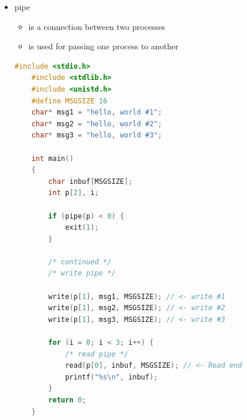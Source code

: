 \documentclass[12pt]{article}
\begin{document}
\bigskip

\begin{itemize}
    \item pipe
    \begin{itemize}
        \item is a connection between two processes
        \item is used for passing one process to another
    \end{itemize}

    \begin{lstlisting}[language=c, caption={select\_example\_2\_1.c}]
    #include <stdio.h>
    #include <stdlib.h>
    #include <unistd.h>
    #define MSGSIZE 16
    char* msg1 = "hello, world #1";
    char* msg2 = "hello, world #2";
    char* msg3 = "hello, world #3";

    int main()
    {
        char inbuf[MSGSIZE];
        int p[2], i;

        if (pipe(p) < 0) {
            exit(1);
        }

        /* continued */
        /* write pipe */

        write(p[1], msg1, MSGSIZE); // <- write #1
        write(p[1], msg2, MSGSIZE); // <- write #2
        write(p[1], msg3, MSGSIZE); // <- write #3

        for (i = 0; i < 3; i++) {
            /* read pipe */
            read(p[0], inbuf, MSGSIZE); // <- Read end
            printf("%s\n", inbuf);
        }
        return 0;
    }
    \end{lstlisting}


\end{itemize}
\end{document}
